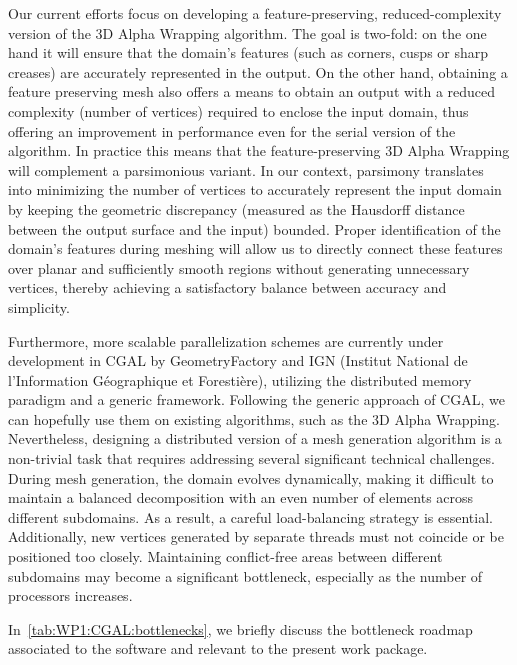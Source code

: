 Our current efforts focus on developing a feature-preserving, reduced-complexity version of the 3D Alpha Wrapping algorithm.
The goal is two-fold: on the one hand it will ensure that the domain's features (such as corners, cusps or sharp creases) are accurately represented in the output. On the other hand, obtaining a feature preserving mesh also offers a means to obtain an output with a reduced complexity (number of vertices) required to enclose the input domain, thus offering an improvement in performance even for the serial version of the algorithm. 
In practice this means that the feature-preserving 3D Alpha Wrapping will complement a parsimonious variant.
In our context, parsimony translates into minimizing the number of vertices to accurately represent the input domain by keeping 
the geometric discrepancy (measured as the Hausdorff distance between the output surface and the input) bounded.
Proper identification of the domain's features during meshing will allow us to directly connect these features over planar and sufficiently 
smooth regions without generating unnecessary vertices, thereby achieving a satisfactory balance between accuracy and simplicity.


Furthermore, more scalable parallelization schemes are currently under development in CGAL by GeometryFactory and IGN (Institut National de l'Information Géographique et Forestière), utilizing the distributed memory paradigm and a generic framework. Following the generic approach of CGAL, we can hopefully use them on existing algorithms, such as the 3D Alpha Wrapping. 
Nevertheless, designing a distributed version of a mesh generation algorithm is a non-trivial task that requires addressing several significant technical challenges.
During mesh generation, the domain evolves dynamically, making it difficult to maintain a balanced decomposition with an even number of elements across different subdomains.
As a result, a careful load-balancing strategy is essential.
Additionally, new vertices generated by separate threads must not coincide or be positioned too closely. Maintaining conflict-free areas between different subdomains may become a significant bottleneck, especially as the number of processors increases.


In~\cref{tab:WP1:CGAL:bottlenecks}, we briefly discuss the bottleneck roadmap associated to the software and relevant to the present work package.

